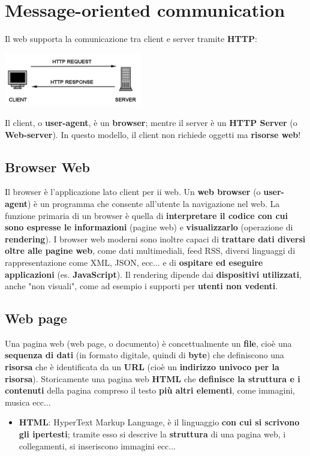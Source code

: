 \documentclass[12pt]{article}
\begin{document}
\section{Message-oriented communication}
Il web supporta la comunicazione tra client e server tramite \textbf{HTTP}:
\begin{center}
    \includegraphics[width = 0.45\textwidth]{Images/112.PNG}
\end{center}
Il client, o \textbf{user-agent}, è un \textbf{browser}; mentre il server è un \textbf{HTTP Server} (o \textbf{Web-server}). In questo modello, il client non richiede oggetti ma \textbf{risorse web}!
\subsection{Browser Web}
Il browser è l'applicazione lato client per ii web. Un \textbf{web browser} (o \textbf{user-agent}) è un programma che consente all'utente la navigazione nel web. La funzione primaria di un browser è quella di \textbf{interpretare il codice con cui sono espresse le informazioni} (pagine web) e \textbf{visualizzarlo} (operazione di \textbf{rendering}). I browser web moderni sono inoltre capaci di \textbf{trattare dati diversi oltre alle pagine web}, come dati multimediali, feed RSS, diversi linguaggi di rappresentazione come XML, JSON, ecc... e di \textbf{ospitare ed eseguire applicazioni} (es. \textbf{JavaScript}). Il rendering dipende dai \textbf{dispositivi utilizzati}, anche "non visuali", come ad esempio i supporti per \textbf{utenti non vedenti}.
\subsection{Web page}
Una pagina web (web page, o documento) è concettualmente un \textbf{file}, cioè una \textbf{sequenza di dati} (in formato digitale, quindi di \textbf{byte}) che definiscono una \textbf{risorsa} che è identificata da un \textbf{URL} (cioè un \textbf{indirizzo univoco per la risorsa}). Storicamente una pagina web \textbf{HTML} che \textbf{definisce la struttura e i contenuti} della pagina compreso il testo \textbf{più altri elementi}, come immagini, musica ecc... \newline
\begin{itemize}
    \item \textbf{HTML}: HyperText Markup Language, è il linguaggio \textbf{con cui si scrivono gli ipertesti}; tramite esso si descrive la \textbf{struttura} di una pagina web, i collegamenti, si inseriscono immagini ecc...
\end{itemize}
\end{document}
